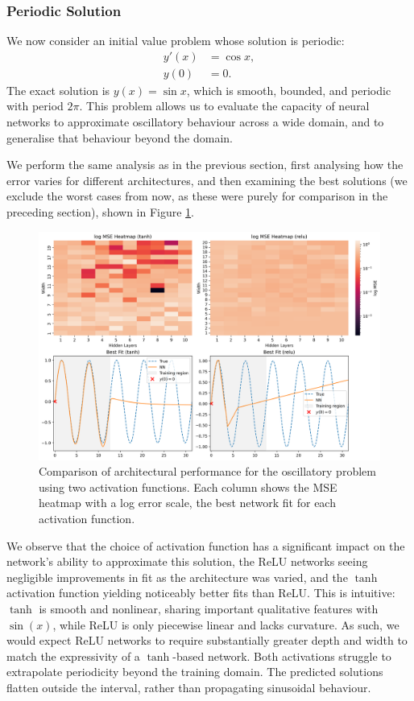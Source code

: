 \subsubsection{Periodic Solution}

We now consider an initial value problem whose solution is periodic:
\[
\begin{aligned}
    y'(x) &= \cos x, \\
    y(0) &= 0.
\end{aligned}
\]
The exact solution is \( y(x) = \sin x \), which is smooth, bounded, and periodic with period \( 2\pi \).  
This problem allows us to evaluate the capacity of neural networks to approximate oscillatory behaviour
across a wide domain, and to generalise that behaviour beyond the domain.  

We perform the same analysis as in the previous section, first analysing how the error varies
for different architectures, and then examining the best solutions (we exclude the worst 
cases from now, as these were purely for comparison in the preceding section), shown in Figure 
\ref{fig:ivp_periodic_sidebyside}.

\begin{figure}[h]
    \centering
    \includegraphics[width=\textwidth]{graphics/ivp_periodic_combined.png}
    \caption{Comparison of architectural performance for the oscillatory problem using two 
    activation functions. Each column shows the MSE heatmap with a log error scale,
    the best network fit for each activation function.}
    \label{fig:ivp_periodic_sidebyside}
\end{figure}

We observe that the choice of activation function has a significant impact on the network's 
ability to approximate this solution, the ReLU networks seeing negligible improvements 
in fit as the architecture was varied, and the \(\tanh\) activation function yielding 
noticeably better fits than ReLU. This is intuitive: \(\tanh\) is smooth and nonlinear, 
sharing important qualitative features with \(\sin(x)\), while ReLU is only piecewise linear 
and lacks curvature. As such, we would expect ReLU networks to require substantially greater 
depth and width to match the expressivity of a \(\tanh\)-based network. 
Both activations struggle to extrapolate periodicity beyond the training domain.
The predicted solutions flatten outside the interval, rather than 
propagating sinusoidal behaviour.


